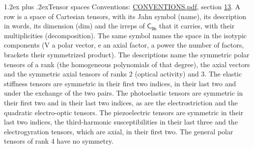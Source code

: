 \documentclass[10pt,a4paper]{article}
\makeatletter
\renewcommand\section{\@startsection{section}{1}{\z@}{-3ex plus -1ex minus -.2ex}%
  {1.2ex plus .2ex}{\normalfont\large\sffamily\bfseries\color{parttitle}}}
\numberwithin{equation}{section}
\newcommand{\grp}[1]{\mathsf{#1}}
\makeatother
\begin{document}
\section{Tensor spaces}\label{s:tensor_spaces}
Conventions: \href{../../CONVENTIONS.pdf}{CONVENTIONS.pdf}, section \href{../../CONVENTIONS.pdf\#conv.13}{13}.
\leavevmode\label{n:head.name}\label{n:head.description}\label{n:head.dim}\label{n:head.decomposition}A row is a space of Cartesian tensors, with its Jahn symbol (name), its description in words, its dimension (dim) and the irreps of $\grp{C_{9h}}$ that it carries, with their multiplicities (decomposition). \label{n:label.jahn}The same symbol names the space in the isotypic components (V a polar vector, e an axial factor, a power the number of factors, brackets their symmetrized product). The descriptions name the symmetric polar tensors of a rank (the homogeneous polynomials of that degree), the axial vectors and the symmetric axial tensors of ranks 2 (optical activity) and 3. The elastic stiffness tensors are symmetric in their first two indices, in their last two and under the exchange of the two pairs. The photoelastic tensors are symmetric in their first two and in their last two indices, as are the electrostriction and the quadratic electro-optic tensors. The piezoelectric tensors are symmetric in their last two indices, the third-harmonic susceptibilities in their last three and the electrogyration tensors, which are axial, in their first two. The general polar tensors of rank 4 have no symmetry.
\end{document}
